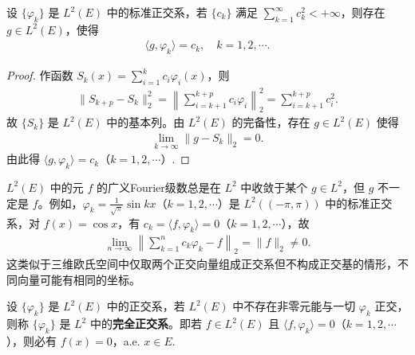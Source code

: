 \documentclass[../../main.tex]{subfiles}%
\begin{document}
\begin{theorem}\label{theorem:实变函数--Riesz-Fischer定理原始形式}
设 $\{\varphi_k\}$ 是 $L^2(E)$ 中的标准正交系，若 $\{c_k\}$ 满足 $\sum\limits_{k=1}^\infty c_k^2 < +\infty$，则存在 $g \in L^2(E)$，使得
\begin{align*}
\langle g, \varphi_k \rangle = c_k, \quad k=1,2,\cdots.
\end{align*}
\end{theorem}
\begin{proof}

作函数 $S_k(x) = \sum\limits_{i=1}^k c_i \varphi_i(x)$，则
\begin{align*}
\|S_{k+p} - S_k\|_2^2 = \left\| \sum_{i=k+1}^{k+p} c_i \varphi_i \right\|_2^2 = \sum_{i=k+1}^{k+p} c_i^2.
\end{align*}
故 $\{S_k\}$ 是 $L^2(E)$ 中的基本列。由 $L^2(E)$ 的完备性，存在 $g \in L^2(E)$ 使得
\begin{align*}
\lim_{k \to \infty} \|g - S_k\|_2 = 0.
\end{align*}
由此得 $\langle g, \varphi_k \rangle = c_k$（$k=1,2,\cdots$）.

\end{proof}

\begin{remark}
$L^2(E)$ 中的元 $f$ 的广义Fourier级数总是在 $L^2$ 中收敛于某个 $g \in L^2$，但 $g$ 不一定是 $f$。例如，$\varphi_k = \frac{1}{\sqrt{\pi}} \sin kx$（$k=1,2,\cdots$）是 $L^2((-\pi, \pi))$ 中的标准正交系，对 $f(x) = \cos x$，有 $c_k = \langle f, \varphi_k \rangle = 0$（$k=1,2,\cdots$），故
\begin{align*}
\lim_{n \to \infty} \left\| \sum_{k=1}^n c_k \varphi_k - f \right\|_2 = \|f\|_2 \neq 0.
\end{align*}
这类似于三维欧氏空间中仅取两个正交向量组成正交系但不构成正交基的情形，不同向量可能有相同的坐标。
\end{remark}

\begin{definition}[完全正交系]
设 $\{\varphi_k\}$ 是 $L^2(E)$ 中的正交系，若 $L^2(E)$ 中不存在非零元能与一切 $\varphi_k$ 正交，则称 $\{\varphi_k\}$ 是 $L^2$ 中的\textbf{完全正交系}。即若 $f \in L^2(E)$ 且 $\langle f, \varphi_k \rangle = 0$（$k=1,2,\cdots$），则必有 $f(x) = 0$，a.e. $x \in E$.
\end{definition}
\end{document}

